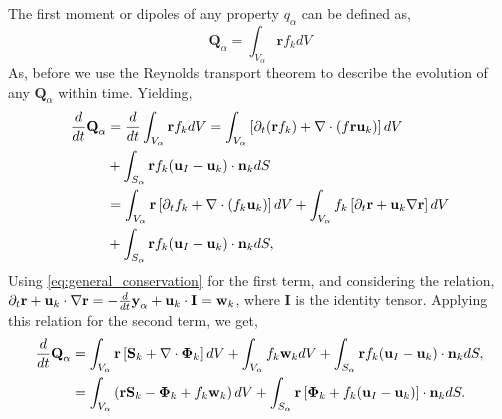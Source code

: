 The first moment or dipoles of any property $q_\alpha$ can be defined as,
\begin{equation*}
    \textbf{Q}_\alpha 
    = \int_{V_\alpha} \textbf{r} f_k dV
\end{equation*}
As, before we use the Reynolds transport theorem to describe the evolution of any $\textbf{Q}_\alpha$ within time. 
Yielding,
\begin{align}
    \frac{d}{d t} \textbf{Q}_\alpha
    & = \frac{d}{d t} \int_{V_\alpha} \textbf{r} f_k dV  
    =  \int_{V_\alpha} \left[
        \partial_t(\textbf{r}  f_k)
        + \mathbf{\nabla} \cdot \left(f \textbf{r} \textbf{u}_k\right)
    \right]dV \nonumber \\
    &+ \int_{S_\alpha} \textbf{r}  f_k  (\textbf{u}_I-\textbf{u}_k)\cdot \textbf{n}_k  dS  \nonumber \\
    &=  \int_{V_\alpha} \textbf{r}\left[
        \partial_t f_k
        + \mathbf{\nabla} \cdot \left(f_k \textbf{u}_k\right)
    \right] dV
    + \int_{V_\alpha} f_k \left[
        \partial_t \textbf{r}
        +\textbf{u}_k \mathbf{\nabla} \textbf{r}
    \right]dV\\
    &+ \int_{S_\alpha} \textbf{r}  f_k (\textbf{u}_I-\textbf{u}_k)\cdot \textbf{n}_k  dS,
\end{align}
Using \ref{eq:general_conservation} for the first term, and considering the relation,
$  \partial_t \textbf{r}
+ \textbf{u}_k \cdot \mathbf{\nabla} \textbf{r}
= - \frac{d}{dt} \textbf{y}_\alpha  + \textbf{u}_k \cdot \textbf{I}
= \textbf{w}_k$,
where $\textbf{I}$ is the identity tensor. 
Applying this relation for the second term, we get, 
\begin{align}
    \frac{d}{d t} \textbf{Q}_\alpha
    &= \int_{V_\alpha} \textbf{r} \left[
         \textbf{S}_k +  \mathbf{\nabla} \cdot \bm{\Phi}_k
    \right]dV
    +\int_{V_\alpha} f_k  \textbf{w}_k dV
    + \int_{S_\alpha} \textbf{r}  f_k (\textbf{u}_I-\textbf{u}_k)\cdot \textbf{n}_k  dS,\\
    &= \int_{V_\alpha} \left( 
        \textbf{r} \textbf{S}_k 
        - \bm{\Phi}_k
        + f_k  \textbf{w}_k 
    \right) dV
    + \int_{S_\alpha} \textbf{r} \left[
        \bm{\Phi}_k
        + f_k (\textbf{u}_I-\textbf{u}_k)
    \right]\cdot \textbf{n}_k  dS.
\end{align}